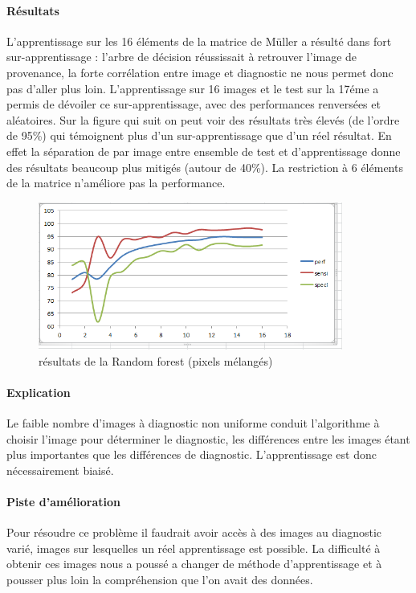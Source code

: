 \documentclass[a4paper,10pt]{report}
\begin{document}
\paragraph{Résultats}
L'apprentissage sur les 16 éléments de la matrice de Müller a résulté dans fort sur-apprentissage : l'arbre de décision réussissait à retrouver l'image de provenance, la forte corrélation entre image et diagnostic ne nous permet donc pas d'aller plus loin. L'apprentissage sur 16 images et le test sur la 17éme a permis de dévoiler ce sur-apprentissage, avec des performances renversées et aléatoires. Sur la figure qui suit on peut voir des résultats très élevés (de l'ordre de 95\%) qui témoignent plus d'un sur-apprentissage que d'un réel résultat. En effet la séparation de par image entre ensemble de test et d'apprentissage donne des résultats beaucoup plus mitigés (autour de 40\%). La restriction à 6 éléments de la matrice n'améliore pas la performance. 
\begin{figure}[htbp]
  \caption{résultats de la Random forest (pixels mélangés)}
  \centering
  \includegraphics[width=10cm]{RandomForestPerf.png}
\end{figure}
\paragraph{Explication}
Le faible nombre d'images à diagnostic non uniforme conduit l'algorithme à choisir l'image pour déterminer le diagnostic, les différences entre les images étant plus importantes que les différences de diagnostic. L'apprentissage est donc nécessairement biaisé. 
\paragraph{Piste d'amélioration}
Pour résoudre ce problème il faudrait avoir accès à des images au diagnostic varié, images sur lesquelles un réel apprentissage est possible. La difficulté à obtenir ces images nous a poussé a changer de méthode d'apprentissage et à pousser plus loin la compréhension que l'on avait des données.
\end{document}
